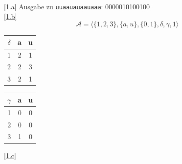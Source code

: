 \documentclass[a4paper, 12pt, margins=3cm]{homework}
\begin{document}
\begin{solution}
  \ref{1.a}
  Ausgabe zu \texttt{uuaauauaauaaa}: 0000010100100 \\

  \ref{1.b}
  \[ \mathcal{A} = \langle \{1,2,3\}, \{a,u\}, \{0,1\}, \delta, \gamma, 1 \rangle \]

  \begin{minipage}{0.5\textwidth}
    \begin{center}
      \begin{tabular}{c|cc}
        $\delta$ & a & u \\ \hline
        1        & 2 & 1 \\
        2        & 2 & 3 \\
        3        & 2 & 1
      \end{tabular}
    \end{center}
  \end{minipage}
  \begin{minipage}{0.5\textwidth}
    \begin{center}
      \begin{tabular}{c|cc}
        $\gamma$ & a & u \\ \hline
        1        & 0 & 0 \\
        2        & 0 & 0 \\
        3        & 1 & 0
      \end{tabular}
    \end{center}
  \end{minipage}

  \ref{1.c} \\


\end{solution}
\end{document}
